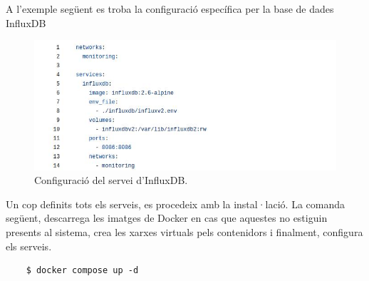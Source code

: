 \clearpage

\noindent
A l'exemple següent es troba la configuració específica per la base de dades InfluxDB

\begin{figure}[htbp]
    \centerline{\includegraphics[width=\textwidth]{figures/docker-compose-influxdb}}
    \captionsetup{justification=centering}
    \caption{Configuració del servei d'InfluxDB.}\label{fig:docker-compose-influxdb}
\end{figure}

\noindent
Un cop definits tots els serveis, es procedeix amb la instal·lació.
La comanda següent, descarrega les imatges de Docker en cas que aquestes no estiguin presents al sistema,
crea les xarxes virtuals pels contenidors i finalment, configura els serveis.

\begin{verbatim}
    $ docker compose up -d
\end{verbatim}
